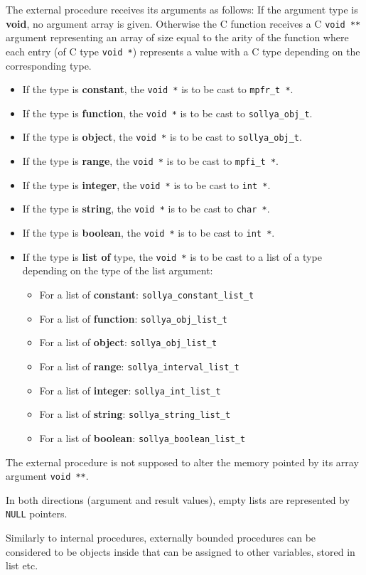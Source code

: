 \begin{itemize}
   The external procedure receives its arguments as follows: If the \sollya
   argument type is \textbf{void}, no argument array is given. Otherwise the C function
   receives a C \texttt{void **} argument representing an array of size equal to the
   arity of the function where each entry (of C type \texttt{void *}) represents a value
   with a C type depending on the corresponding \sollya type.\begin{itemize}
     \item If the \sollya type is \textbf{constant}, the \texttt{void *} is to be cast to \texttt{mpfr\_t *}.
     \item If the \sollya type is \textbf{function}, the \texttt{void *} is to be cast to
        \texttt{sollya\_obj\_t}.
     \item If the \sollya type is \textbf{object}, the \texttt{void *} is to be cast to \texttt{sollya\_obj\_t}.
     \item If the \sollya type is \textbf{range}, the \texttt{void *} is to be cast to \texttt{mpfi\_t *}.
     \item If the \sollya type is \textbf{integer}, the \texttt{void *} is to be cast to \texttt{int *}.
     \item If the \sollya type is \textbf{string}, the \texttt{void *} is to be cast to \texttt{char *}.
     \item If the \sollya type is \textbf{boolean}, the \texttt{void *} is to be cast to \texttt{int *}.
     \item If the \sollya type is \textbf{list of} type, the \texttt{void *} is to be cast to a list
        of a type depending on the type of the list argument:\begin{itemize}
          \item For a list of \textbf{constant}: \verb|sollya_constant_list_t|
          \item For a list of \textbf{function}: \verb|sollya_obj_list_t|
          \item For a list of \textbf{object}: \verb|sollya_obj_list_t|
          \item For a list of \textbf{range}: \verb|sollya_interval_list_t|
          \item For a list of \textbf{integer}: \verb|sollya_int_list_t|
          \item For a list of \textbf{string}: \verb|sollya_string_list_t|
          \item For a list of \textbf{boolean}: \verb|sollya_boolean_list_t| \end{itemize}
   \end{itemize}
   The external procedure is not supposed to alter the memory pointed by its
   array argument \texttt{void **}.
    
   In both directions (argument and result values), empty lists are represented
   by \texttt{NULL} pointers.
    
   Similarly to internal procedures, externally bounded procedures can be
   considered to be objects inside \sollya that can be assigned to other
   variables, stored in list etc.
\end{itemize}
